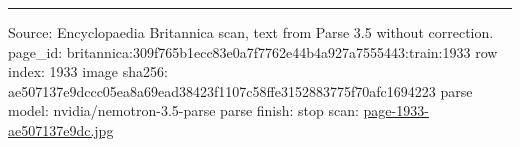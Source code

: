 \documentclass[10pt]{article}
\begin{document}
\vfill\par\noindent\rule{\linewidth}{0.4pt}\par
{\scriptsize\color{gray}\noindent Source: Encyclopaedia Britannica scan, text from Parse 3.5 without correction. page\_id: britannica:309f765b1ecc83e0a7f7762e44b4a927a7555443:train:1933 \quad row index: 1933 \quad image sha256: ae507137e9dccc05ea8a69ead38423f1107c58ffe3152883775f70afc1694223 \quad parse model: nvidia/nemotron-3.5-parse \quad parse finish: stop \quad scan: \href{../scans/page-1933-ae507137e9dc.jpg}{page-1933-ae507137e9dc.jpg}\par}
\end{document}
